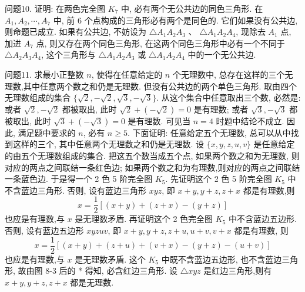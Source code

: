 问题10. 证明: 在两色完全图 $K_7$ 中, 必有两个无公共边的同色三角形.
在 $A_1, A_2, \cdots, A_7$ 中, 前 6 个点构成的三角形必有两个是同色的.
它们如果没有公共边, 则命题已成立.
如果有公共边, 不妨设为 $\triangle A_1 A_2 A_3$ 、 $\triangle A_1 A_2 A_4$, 现除去 $A_1$ 点, 加进 $A_7$ 点, 则又存在两个同色三角形, 在这两个同色三角形中必有一个不同于 $\triangle A_2 A_3 A_4$, 这个三角形与 $\triangle A_1 A_2 A_3$ 或 $\triangle A_1 A_2 A_4$ 中的一个无公共边.



问题11. 求最小正整数 $n$, 使得在任意给定的 $n$ 个无理数中, 总存在这样的三个无理数,其中任意两个数之和仍是无理数.
但没有公共边的两个单色三角形.
取由四个无理数组成的集合 $\{\sqrt{2},-\sqrt{2}, \sqrt{3},-\sqrt{3}\}$. 从这个集合中任意取出三个数, 必然是: 或者 $\sqrt{2},-\sqrt{2}$ 都被取出, 此时 $\sqrt{2}+(-\sqrt{2})=0$ 是有理数; 或者 $\sqrt{3},-\sqrt{3}$ 都被取出, 此时 $\sqrt{3}+(-\sqrt{3})=0$ 是有理数.
可见当 $n=4$ 时题中结论不成立.
因此, 满足题中要求的 $n$, 必有 $n \geqslant 5$. 下面证明: 任意给定五个无理数, 总可以从中找到这样的三个, 其中任意两个无理数之和仍是无理数.
设 $\{x, y, z, u, v\}$ 是任意给定的由五个无理数组成的集合.
把这五个数当成五个点, 如果两个数之和为无理数, 则对应的两点之间联结一条红色边;
如果两个数之和为有理数,则对应的两点之间联结一条蓝色边.
于是得一个 2 色 5 阶完全图 $K_5$. 先证明这个 2 色 5 阶完全图 $K_5$ 中不含蓝边三角形.
否则, 设有蓝边三角形 $x y z$, 即 $x+y, y+z, z+x$ 都是有理数,则
$$
x=\frac{1}{2}[(x+y)+(z+x)-(y+z)]
$$
也应是有理数,与 $x$ 是无理数矛盾.
再证明这个 2 色完全图 $K_5$ 中不含蓝边五边形.
否则, 设有蓝边五边形 $x y z u v$, 即 $x+y, y+z, z+u, u+v, v+x$ 都是有理数, 则
$$
x=\frac{1}{2}[(x+y)+(z+u)+(v+x)-(y+z)-(u+v)]
$$
也应是有理数,与 $x$ 是无理数矛盾.
这个 $K_5$ 中既不含蓝边五边形, 也不含蓝边三角形, 故由图 8-3 后的 * 得知, 必含红边三角形.
设 $\triangle x y z$ 是红边三角形,则有 $x+y, y+z, z+x$ 都是无理数.



